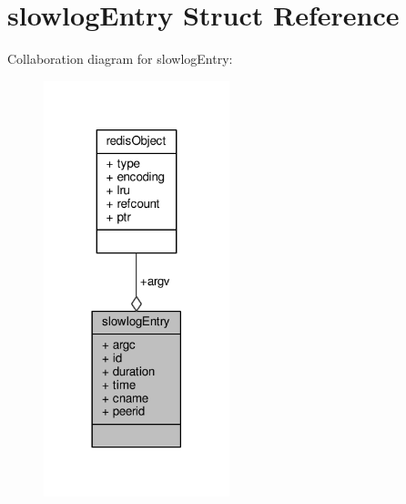 \hypertarget{structslowlogEntry}{}\section{slowlog\+Entry Struct Reference}
\label{structslowlogEntry}


Collaboration diagram for slowlog\+Entry\+:\nopagebreak
\begin{figure}[H]
\begin{center}
\leavevmode
\includegraphics[width=153pt]{structslowlogEntry__coll__graph}
\end{center}
\end{figure}
